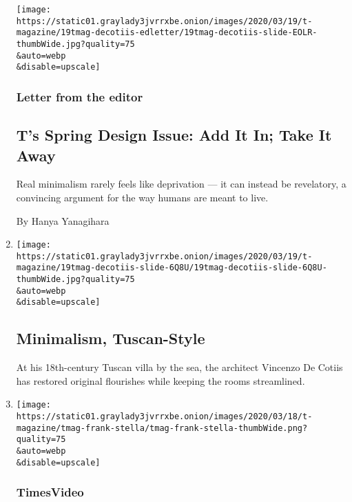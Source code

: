 \begin{enumerate}
  \texttt{[image: https://static01.graylady3jvrrxbe.onion/images/2020/03/19/t-magazine/19tmag-decotiis-edletter/19tmag-decotiis-slide-EOLR-thumbWide.jpg?quality=75\\\&auto=webp\\\&disable=upscale]}

  \hypertarget{letter-from-the-editor}{%
  \subsubsection{Letter from the editor}\label{letter-from-the-editor}}

  \hypertarget{ts-spring-design-issue-add-it-in-take-it-away}{%
  \subsection{T's Spring Design Issue: Add It In; Take It
  Away}\label{ts-spring-design-issue-add-it-in-take-it-away}}

  Real minimalism rarely feels like deprivation --- it can instead be
  revelatory, a convincing argument for the way humans are meant to
  live.

  By Hanya Yanagihara
\item
  \href{/slideshow/2020/03/19/t-magazine/minimalism-tuscan-style.html}{}

  \texttt{[image: https://static01.graylady3jvrrxbe.onion/images/2020/03/19/t-magazine/19tmag-decotiis-slide-6Q8U/19tmag-decotiis-slide-6Q8U-thumbWide.jpg?quality=75\\\&auto=webp\\\&disable=upscale]}

  \hypertarget{minimalism-tuscan-style}{%
  \subsection{Minimalism, Tuscan-Style}\label{minimalism-tuscan-style}}

  At his 18th-century Tuscan villa by the sea, the architect Vincenzo De
  Cotiis has restored original flourishes while keeping the rooms
  streamlined.
\item
  \href{/video/t-magazine/100000007025848/my-favorite-artwork-frank-stella.html}{}

  \texttt{[image: https://static01.graylady3jvrrxbe.onion/images/2020/03/18/t-magazine/tmag-frank-stella/tmag-frank-stella-thumbWide.png?quality=75\\\&auto=webp\\\&disable=upscale]}

  \hypertarget{timesvideo}{%
  \subsubsection{TimesVideo}\label{timesvideo}}


\end{enumerate}
